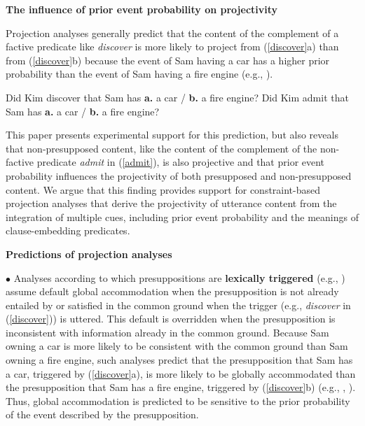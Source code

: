 \documentclass[12pt,fleqn]{article}
\newcommand{\6}{\mbox{$[\hspace*{-.6mm}[$}}
\newcommand{\9}{\mbox{$]\hspace*{-.6mm}]$}}
\begin{document}
  
\begin{center}
{\bf The influence of prior event probability on projectivity}
\end{center}

\vspace*{-.3cm}

\noindent
Projection analyses generally predict that the content of the complement of a factive predicate like {\em discover} is more likely to project from (\ref{discover}a) than from (\ref{discover}b) because the event of Sam having a car has a higher prior probability than the event of Sam having a fire engine (e.g., \citealt{heim83,vds92,brst-salt10,abrusan2011,brst-ar}).
\vspace*{-.15cm}
\begin{exe}
\ex\label{discover} Did Kim discover that Sam has {\bf a.} a car  \hspace*{.1cm} / \hspace*{.1cm} {\bf b.} a fire engine?
\vspace*{-.1cm}
\ex\label{admit} Did Kim admit that Sam has {\bf a.} a car  \hspace*{.1cm} / \hspace*{.1cm} {\bf b.} a fire engine?
\end{exe}
\vspace*{-.15cm}
This paper presents experimental support for this prediction, but also reveals that non-presupposed content, like the content of the complement of the non-factive predicate {\em admit} in (\ref{admit}), is also projective and that prior event probability influences the projectivity of both presupposed and non-presupposed content. We argue that this finding provides support for constraint-based projection analyses that derive the projectivity of utterance content from the integration of multiple cues, including prior event probability and the meanings of clause-embedding predicates.

\noindent
{\bf Predictions of projection analyses}

\noindent
{\bf $\bullet$} Analyses according to which presuppositions are {\bf lexically triggered} (e.g., \citealt{heim83,vds92}) assume default global accommodation when the presupposition is not already entailed by or satisfied in the common ground when the trigger (e.g., {\em discover} in (\ref{discover})) is uttered. This default is overridden when the presupposition is inconsistent with information already in the common ground. Because Sam owning a car is more likely to be consistent with the common ground than Sam owning a fire engine, such analyses predict that the presupposition that Sam has a car, triggered by (\ref{discover}a), is more likely to be globally accommodated than the presupposition that Sam has a fire engine, triggered by (\ref{discover}b) (e.g., \citealt{gazdar79a}, \citealt{levinson83}). Thus, global accommodation is predicted to be sensitive to the prior probability of the event described by the presupposition.
\end{document}
